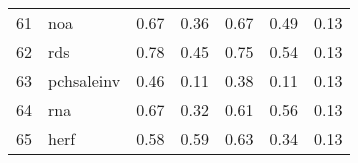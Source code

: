 \documentclass[12pt]{article}
\begin{document}
\begin{footnotesize}
\begin{longtable}{rl|c|c|c|c|c}
				61                   & noa                         & 0.67                             & 0.36                                                                                          & 0.67                                                                                          & 0.49                                                                                          & 0.13                                                                                                   \\
				62                   & rds                         & 0.78                             & 0.45                                                                                          & 0.75                                                                                          & 0.54                                                                                          & 0.13                                                                                                   \\
				63                   & pchsaleinv                  & 0.46                             & 0.11                                                                                          & 0.38                                                                                          & 0.11                                                                                          & 0.13                                                                                                   \\
				64                   & rna                         & 0.67                             & 0.32                                                                                          & 0.61                                                                                          & 0.56                                                                                          & 0.13                                                                                                   \\
				65                   & herf                        & 0.58                             & 0.59                                                                                          & 0.63                                                                                          & 0.34                                                                                          & 0.13                                                                                                   \\

\end{longtable}
\end{footnotesize}
\end{document}
